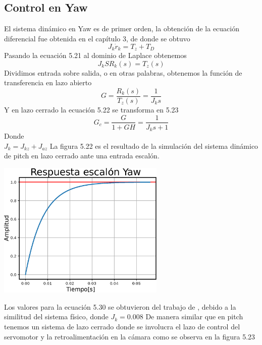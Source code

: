 \subsection{Control en Yaw}
El sistema dinámico en Yaw es de primer orden, la obtención de la ecuación diferencial
fue obtenida en el capítulo 3, de donde se obtuvo
\begin{equation}
	J_k\dot{r}_k = T_z+T_D
\end{equation}
Pasando la ecuación 5.21 al dominio de Laplace obtenemos
\begin{equation}
	J_{k}SR_k(s) = T_z(s)
\end{equation}
Dividimos entrada sobre salida, o en otras palabras, obtenemos la función de transferencia en lazo abierto
\begin{equation}
	G = \frac{R_k(s)}{T_z(s)} =  \frac{1}{J_{k}s}
\end{equation}
Y en lazo cerrado la ecuación 5.22 se transforma en 5.23 
\begin{equation}
	G_c = \frac{G}{1 +GH} = \frac{1}{J_{k}s+1}
\end{equation}
Donde \\
$J_k = J_{kz} + J_{az} $ 
La figura 5.22 es el resultado de la simulación del sistema dinámico de pitch en lazo cerrado ante una entrada escalón.
\begin{center}
	\includegraphics[width=0.6\textwidth]{Contenido/Cuerpo/Capitulo5/Fig39.eps}
	\label{Fig4}
\end{center}
Los valores para la ecuación 5.30 se obtuvieron del trabajo de \cite{Paper::Abdo2013}, debido a la similitud del sistema físico, donde
$J_{k} = 0.008$
De manera similar que en pitch tenemos un sistema de lazo cerrado donde se involucra el lazo de control del
servomotor y la retroalimentación en la cámara como se observa en la figura 5.23

